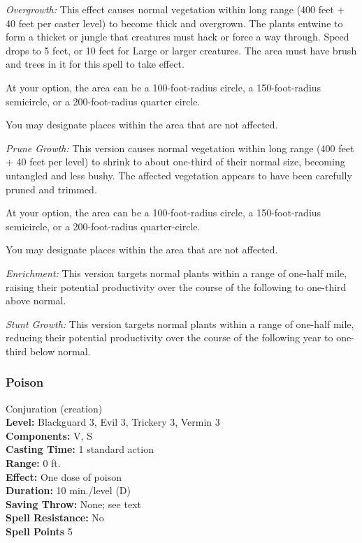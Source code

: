 \begin{list}{}{\leftmargin=1em}
 \item \emph{Overgrowth:}
This effect causes normal vegetation within long range (400 feet + 40 feet per caster level) to become thick and overgrown. The plants entwine to form a thicket or jungle that creatures must hack or force a way through. Speed drops to 5 feet, or 10 feet for Large or larger creatures. The area must have brush and trees in it for this spell to take effect.

At your option, the area can be a 100-foot-radius circle, a 150-foot-radius semicircle, or a 200-foot-radius quarter circle.

You may designate places within the area that are not affected.
\item \emph{Prune Growth:}
This version causes normal vegetation within long range (400 feet + 40 feet per level) to shrink to about one-third of their normal size, becoming untangled and less bushy. The affected vegetation appears to have been carefully pruned and trimmed.

At your option, the area can be a 100-foot-radius circle, a 150-foot-radius semicircle, or a 200-foot-radius quarter-circle.

You may designate places within the area that are not affected.
\item \emph{Enrichment:}
This version targets normal plants within a range of one-half mile, raising their potential productivity over the course of the following to one-third above normal.
\item \emph{Stunt Growth:}
This version targets normal plants within a range of one-half mile, reducing their potential productivity over the course of the following year to one-third below normal.
\end{list}
\subsubsection{Poison}
\label{Spell:Poison}
Conjuration (creation)
\\ \textbf{Level:} Blackguard 3, Evil 3, Trickery 3, Vermin 3
\\ \textbf{Components:} V, S
\\ \textbf{Casting Time:} 1 standard action
\\ \textbf{Range:} 0 ft.
\\ \textbf{Effect:} One dose of poison
\\ \textbf{Duration:} 10 min./level (D)
\\ \textbf{Saving Throw:} None; see text
\\ \textbf{Spell Resistance:} No
\\ \textbf{Spell Points} 5

